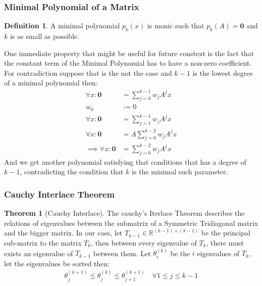 \documentclass[]{article}
\theoremstyle{definition}
\newtheorem{theorem}{Theorem}            %
\newtheorem{definition}{Definition}
\begin{document}
        \subsubsection{Minimal Polynomial of a Matrix}
            \begin{definition}
                A minimal polynomial $p_k(x)$ is monic such that $p_k(A) = \mathbf{0}$ and $k$ is as small as possible. 
            \end{definition}
            One immediate property that might be useful for future constext is the fact that the constant term of the Minimal Polynomial has to have a non-zero coefficient. For contradiction suppose that is the not the case and $k-1$ is the lowest degree of a minimal polynomial then: 
            \begin{align}
                \forall x: \mathbf 0 &= \sum_{j = 0}^{k - 1}w_jA^jx
                \\
                w_0 &:= 0 
                \\
                \forall x: \mathbf 0 &= \sum_{j = 1}^{k - 1}w_jA^jx
                \\
                \forall x: \mathbf 0 &= A\sum_{j = 0}^{k - 2}w_jA^jx
                \\
                \implies \forall x : \mathbf 0 &= \sum_{j = 0}^{k - 2}w_jA^jx 
            \end{align}
            And we get another polynomial satisfying that conditions that has a degree of $k - 1$, contradicting the condition that $k$ is the minimal such parameter. 
        \subsubsection{Cauchy Interlace Theorem}
            \begin{theorem}[Cauchy Interlace]\label{theorem:Cauchy_Interlace}
                The cauchy's Iterlace Theorem describes the relations of eigenvalues between the submatrix of a Symmetric Tridiagonal matrix and the bigger matrix. In our caes, let $T_{k-1}\in \mathbb R^{(k - 1)\times (k - 1)}$ be the principal sub-matrix to the matrix $T_k$, then between every eigenvalue of $T_{k}$, there must exists an eigenvalue of $T_{k-1}$ between them. Let $\theta_i^{(k)}$ be the $i$ eigenvalues of $T_k$, let the eigenvalues be sorted then: 
                \begin{align}
                    \theta_{j}^{(k + 1)}
                    \le \theta_{j}^{(k)}
                    \le \theta_{j + 1}^{(k + 1)}
                    \quad \forall  1 \le j \le k - 1
                \end{align}
            \end{theorem}
\end{document}
